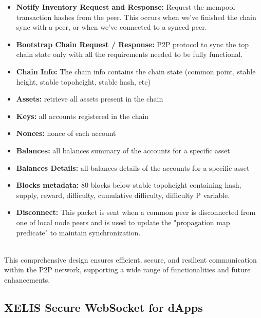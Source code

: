 \documentclass[10pt,a4paper,twocolumn]{article}
\begin{document}
\begin{itemize}
\item \textbf{Notify Inventory Request and Response:} Request the mempool transaction hashes from the peer. This occurs when we’ve finished the chain sync with a peer, or when we’ve connected to a synced peer.\\

\item \textbf{Bootstrap Chain Request / Response:} P2P protocol to sync the top chain state only with all the requirements needed to be fully functional.

\item \textbf{Chain Info:} The chain info contains the chain state (common point, stable height, stable topoheight, stable hash, etc)

\item \textbf {Assets:} retrieve all assets present in the chain

\item \textbf {Keys:} all accounts registered in the chain

\item \textbf {Nonces:} nonce of each account

\item \textbf {Balances:} all balances summary of the accounts for a specific asset

\item \textbf {Balances Details:} all balances details of the accounts for a specific asset

\item \textbf {Blocks metadata:} 80 blocks below stable topoheight containing hash, supply, reward, difficulty, cumulative difficulty, difficulty P variable.

\item \textbf{Disconnect:} This packet is sent when a common peer is disconnected from one of local node peers and is used to update the "propagation map predicate" to maintain synchronization.\\

\end{itemize}\\
This comprehensive design ensures efficient, secure, and resilient communication within the P2P network, supporting a wide range of functionalities and future enhancements.\\

\subsection{XELIS Secure WebSocket for dApps}
\end{document}
